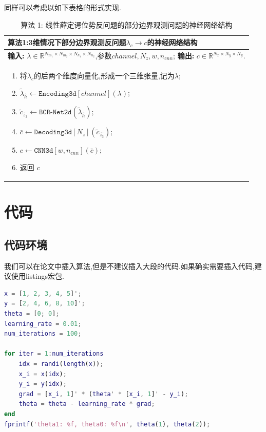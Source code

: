 \documentclass[a4paper,punct=banjiao,twoside]{ctexrep}
\theoremstyle{plain}
\theoremstyle{definition}
\theoremstyle{remark}
\begin{document}
同样可以考虑以如下表格的形式实现.
\begin{table}[H] 
\centering
\begin{tabular}{p{\textwidth}}
\toprule
\textbf{算法1:3维情况下部分边界观测反问题$\lambda_c\rightarrow c$的神经网络结构}  \\%
\midrule
\textbf{输入:} %
$\lambda\in\mathbb{R}^{N_{m_1}\times N_{m_2}\times N_{h_1}\times N_{h_2}}$,参数$channel,N_{z},w,n_{cnn}$;
\textbf{输出:} %
$c\in \mathbb{R}^{N_x\times N_y\times N_y}$. \\[-15pt]%
\begin{enumerate}[1:]
  \item 将$\lambda_c$的后两个维度向量化,形成一个三维张量,记为$\lambda$;
  \item $\tilde{\lambda}_{\hat{h}}\leftarrow\texttt{Encoding3d}[channel](\lambda)$; %
  \item  $\tilde{c}_{\hat{z}_3}\leftarrow\texttt{BCR-Net2d}(\tilde{\lambda}_{\hat{h}}) $; %
  \item $\bar{c}\leftarrow\texttt{Decoding3d}[N_z](\tilde{c}_{\hat{z_3}})$;%
  \item $c\leftarrow\texttt{CNN3d}[w,n_{cnn}](\bar{c})$;%
  \item 返回 $c$ %
\end{enumerate} \\%
\bottomrule
\end{tabular}
\caption*{算法 1: 线性薛定谔位势反问题的部分边界观测问题的神经网络结构\cite{FY20}}
\end{table}

\clearpage
\mbox{}
\thispagestyle{empty}

\appendix
\chapter{代码}
\section{代码环境}
我们可以在论文中插入算法,但是不建议插入大段的代码.如果确实需要插入代码,建议使用listings宏包.
\begin{lstlisting}[language=MATLAB]
x = [1, 2, 3, 4, 5]';
y = [2, 4, 6, 8, 10]';
theta = [0; 0];
learning_rate = 0.01;
num_iterations = 100;

for iter = 1:num_iterations
    idx = randi(length(x));
    x_i = x(idx);
    y_i = y(idx);
    grad = [x_i, 1]' * (theta' * [x_i, 1]' - y_i);
    theta = theta - learning_rate * grad;
end
fprintf('theta1: %f, theta0: %f\n', theta(1), theta(2));
\end{lstlisting}
\end{document}
